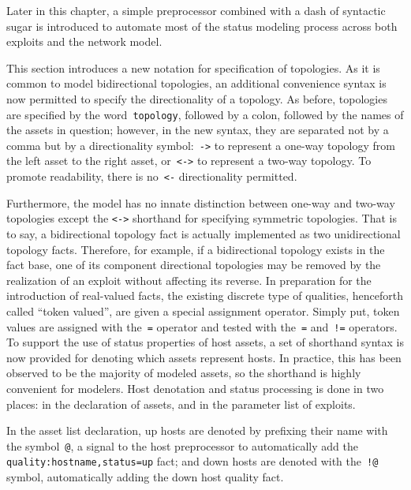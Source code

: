 Later in this chapter, a simple preprocessor combined with a dash of syntactic sugar
is introduced to automate most of the status modeling process across both exploits
and the network model.

This section introduces a new notation for specification of topologies. As it
is common to model bidirectional topologies, an additional convenience syntax
is now permitted to specify the directionality of a topology. As before, 
topologies are specified by the word~\texttt{topology}, followed by a colon, 
followed by the names of the assets in question; however, in the new syntax,
they are separated not by a comma but by a directionality symbol:~\texttt{->} to 
represent a one-way topology from the left asset to the right asset,
or~\texttt{<->} to represent a two-way topology. To promote readability, there
is no~\texttt{<-} directionality permitted.

Furthermore, the model has no innate distinction between one-way and two-way
topologies except the \texttt{<->} shorthand for specifying symmetric topologies.
That is to say, a bidirectional topology fact is actually implemented as
two unidirectional topology facts. Therefore, for example, if a bidirectional
topology exists in the fact base, one of its component directional topologies may
be removed by the realization of an exploit without affecting its reverse.
In preparation for the introduction of real-valued facts, the existing discrete
type of qualities, henceforth called ``token valued'', are given a special
assignment operator. Simply put, token values are assigned with the~\texttt{=}
operator and tested with the~\texttt{=} and~\texttt{!=} operators.
To support the use of status properties of host assets, a set of shorthand
syntax is now provided for denoting which assets represent hosts. In practice,
this has been observed to be the majority of modeled assets, so the shorthand
is highly convenient for modelers. Host denotation and status processing is 
done in two places: in the declaration of assets, and in the parameter list of 
exploits.

In the asset list declaration, up hosts are denoted by prefixing their name with
the symbol~\texttt{@}, a signal to the host preprocessor to automatically add
the \texttt{quality:hostname,status=up} fact; and down hosts are denoted with
the~\texttt{!@} symbol, automatically adding the down host quality fact.

